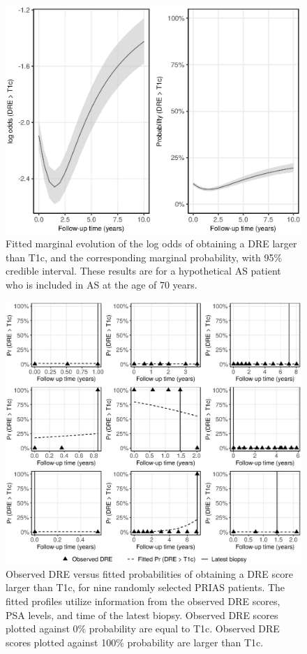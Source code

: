 \begin{figure}[!htb]
\centerline{\includegraphics[width=\columnwidth]{images/marginal_dre_both.eps}}
\caption{Fitted marginal evolution of the log odds of obtaining a DRE larger than T1c, and the corresponding marginal probability, with 95\% credible interval. These results are for a hypothetical AS patient who is included in AS at the age of 70 years.}
\label{fig:fitted_marginal_dre}
\end{figure}

\begin{figure}[!htb]
\centerline{\includegraphics[width=\columnwidth]{images/fitted_9subject_dre.eps}}
\caption{Observed DRE versus fitted probabilities of obtaining a DRE score larger than T1c, for nine randomly selected PRIAS patients. The fitted profiles utilize information from the observed DRE scores, PSA levels, and time of the latest biopsy. Observed DRE scores plotted against 0\% probability are equal to T1c. Observed DRE scores plotted against 100\% probability are larger than T1c.}
\label{fig:fitted_9subject_dre}
\end{figure}

